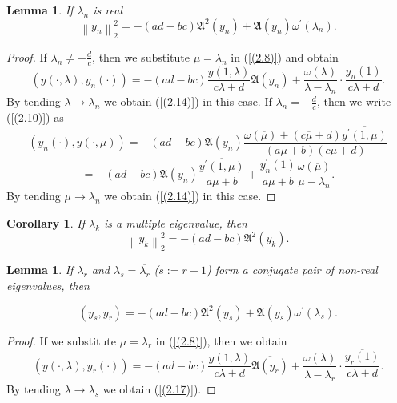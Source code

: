\documentclass[pdflatex,sn-mathphys-num]{sn-jnl}%
\theoremstyle{thmstyleone}%
\theoremstyle{thmstyletwo}%
\theoremstyle{thmstylethree}%
\newtheorem{cor}[thm]{Corollary}
\newtheorem{lem}[thm]{Lemma}
\theoremstyle{definition}
\theoremstyle{remark}
\numberwithin{equation}{section}
\begin{document}
\begin{lem} If $\lambda _{n}$ is real 
\begin{equation}
{\left\| {y_{n} } \right\|}^{2}_{2}=-(ad-bc)\mathfrak{A}^2(y_{n})+\mathfrak{A}(y_{n})\omega^\prime(\lambda_n).
\label{(2.14)}
\end{equation}
\end{lem}
\begin{proof}
If $\lambda_n\neq-\frac{d}{c}$, then we substitute  $\mu=\lambda_n$ in (\ref{(2.8)}) and obtain  
\begin{equation}
\left(y(\cdot,\lambda), y_n(\cdot)\right)
= -(ad - bc)\frac{y(1,\lambda)}{c\lambda + d}\mathfrak{A}(y_{n})
+ \frac{\omega(\lambda)}{\lambda - \lambda_n} \cdot \frac{{y_n(1)}}{c\lambda + d}.\label{(2.15)}
\end{equation}
By tending $\lambda\to\lambda_n$ we obtain (\ref{(2.14)}) in this case.
If \(\lambda_{n}= - \frac{d}{c}\), then we write (\ref{(2.10)}) as
\[
\left(y_n(\cdot), y(\cdot,\mu)\right)
= -(ad - bc)\mathfrak{A}(y_{n})\frac{{\omega(\overline{\mu})+(c\overline{\mu} + d)}\overline{y^\prime(1,\mu)}}{(a\overline{\mu} + b)(c\overline{\mu} + d)}
\]
\begin{equation}
= -(ad - bc)\mathfrak{A}(y_{n})\frac{\overline{y^\prime(1,\mu)}}{a\overline{\mu} + b}+\frac{y_n^\prime(1)}{a\overline{\mu}+b}\frac{\omega(\overline{\mu})}{\overline{\mu}-\lambda_n}. \label{(2.16)}
\end{equation}
By tending $\mu\to\lambda_n$ we obtain (\ref{(2.14)}) in this case.
\end{proof}

\begin{cor}
If $\lambda _{k}$ is a multiple eigenvalue, then 
\begin{equation}
{\left\| {y_{k}} \right\|}^{2}_{2}=-(ad-bc)\mathfrak{A}^2(y_{k}).
\label{(2.17)}
\end{equation}
\end{cor}
\begin{lem}
If $\lambda_r$ and $\lambda_s = \overline{\lambda_r}$ ($s:=r+1$) form a conjugate pair of non-real eigenvalues, then

\begin{equation}
(y_{s},y_{r})=-(ad-bc)\mathfrak{A}^2(y_{s})+\mathfrak{A}(y_{s})\omega^\prime(\lambda_s).\label{(2.18)}
\end{equation}
\end{lem}

\begin{proof}
If we substitute $\mu=\lambda_r$ in (\ref{(2.8)}), then we obtain 
$$
\left(y(\cdot,\lambda), y_r(\cdot)\right)
= -(ad - bc)\frac{y(1,\lambda)}{c\lambda + d}\overline{\mathfrak{A}(y_r)}
+ \frac{\omega(\lambda)}{\lambda - \overline{\lambda_r}} \cdot \frac{\overline{y_r(1)}}{c\lambda + d}.
$$
By tending $\lambda\to\lambda_s$ we obtain (\ref{(2.17)}).
\end{proof}
\end{document}
